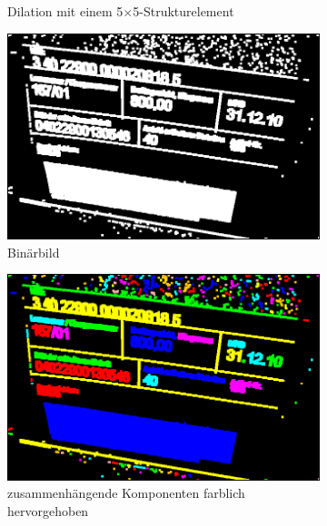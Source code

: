 \begin{figure}[H]
\begin{subfigure}[t]{0.32\columnwidth}
    \caption{\scriptsize Dilation mit einem 5$\times$5-Strukturelement}
  \end{subfigure}
  \begin{subfigure}[t]{0.32\columnwidth}
    \centering
    \includegraphics[width=\columnwidth]{img/techniques/candidate-extraction/binary}
    \caption{\scriptsize Binärbild}
  \end{subfigure}
  \begin{subfigure}[t]{.32\columnwidth}
    \centering
    \includegraphics[width=\columnwidth]{img/techniques/candidate-extraction/components}
    \caption{\scriptsize zusammenhängende Komponenten farblich hervorgehoben}
  \end{subfigure}
  \begin{subfigure}[t]{0.32\columnwidth}
    \centering

\end{subfigure}
\end{figure}
